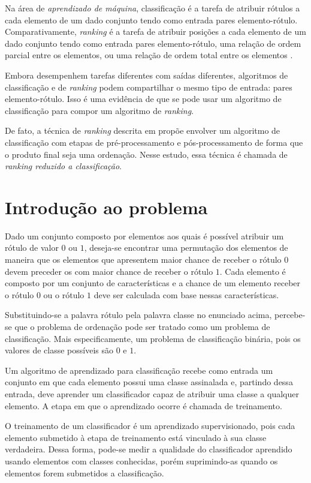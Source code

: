 Na área de \emph{aprendizado de máquina}, classificação é a tarefa de atribuir rótulos a cada elemento de um dado conjunto tendo como entrada pares elemento-rótulo. Comparativamente, \emph{ranking} é a tarefa de atribuir posições a cada elemento de um dado conjunto tendo como entrada pares elemento-rótulo, uma relação de ordem parcial entre os elementos, ou uma relação de ordem total entre os elementos \cite{tieyan09}.

Embora desempenhem tarefas diferentes com saídas diferentes, algoritmos de classificação e de \emph{ranking} podem compartilhar o mesmo tipo de entrada: pares elemento-rótulo. Isso é uma evidência de que se pode usar um algoritmo de classificação para compor um algoritmo de \emph{ranking}.

De fato, a técnica de \emph{ranking} descrita em \cite{langford08} propõe envolver  um algoritmo de classificação com etapas de pré-processamento e pós-processamento de forma que o produto final seja uma ordenação. Nesse estudo, essa técnica é chamada de \emph{ranking reduzido a classificação}.

\section{Introdução ao problema}

Dado um conjunto composto por elementos aos quais é possível atribuir um rótulo de valor $0$ ou $1$, deseja-se encontrar uma permutação dos elementos de maneira que os elementos que apresentem maior chance de receber o rótulo $0$ devem preceder os com maior chance de receber o rótulo $1$. Cada elemento é composto por um conjunto de características e a chance de um elemento receber o rótulo $0$ ou o rótulo $1$ deve ser calculada com base nessas características.

Substituindo-se a palavra rótulo pela palavra classe no enunciado acima, percebe-se que o problema de ordenação pode ser tratado como um problema de classificação. Mais especificamente, um problema de classificação binária, pois os valores de classe possíveis são $0$ e $1$.

Um algoritmo de aprendizado para classificação recebe como entrada um conjunto em que cada elemento possui uma classe assinalada e, partindo dessa entrada, deve aprender um classificador capaz de atribuir uma classe a qualquer elemento. A etapa em que o aprendizado ocorre é chamada de treinamento.

O treinamento de um classificador é um aprendizado supervisionado, pois cada elemento submetido à etapa de treinamento está vinculado à sua classe verdadeira. Dessa forma, pode-se medir a qualidade do classificador aprendido usando elementos com classes conhecidas, porém suprimindo-as quando os elementos forem submetidos a classificação.

